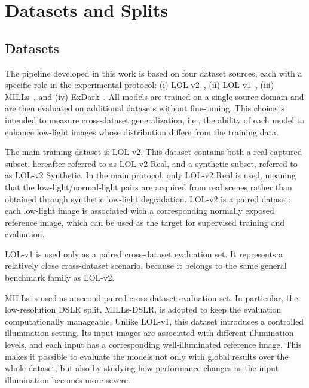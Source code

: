 \section{Datasets and Splits}
\label{sec:datasets_and_splits}

\subsection{Datasets}
\label{sec:datasets}

The pipeline developed in this work is based on four dataset sources, each with a specific role in the experimental protocol: (i) LOL-v2~\cite{DBLP:journals/tip/YangWHWL21}, (ii) LOL-v1~\cite{DBLP:conf/bmvc/WeiWY018}, (iii) MILLs~\cite{DBLP:journals/corr/abs-2511-15496}, and (iv) ExDark~\cite{DBLP:journals/cviu/LohC19}. All models are trained on a single source domain and are then evaluated on additional datasets without fine-tuning. This choice is intended to measure cross-dataset generalization, i.e., the ability of each model to enhance low-light images whose distribution differs from the training data.

The main training dataset is LOL-v2. This dataset contains both a real-captured subset, hereafter referred to as LOL-v2 Real, and a synthetic subset, referred to as LOL-v2 Synthetic. In the main protocol, only LOL-v2 Real is used, meaning that the low-light/normal-light pairs are acquired from real scenes rather than obtained through synthetic low-light degradation. LOL-v2 is a paired dataset: each low-light image is associated with a corresponding normally exposed reference image, which can be used as the target for supervised training and evaluation.

LOL-v1 is used only as a paired cross-dataset evaluation set. It represents a relatively close cross-dataset scenario, because it belongs to the same general benchmark family as LOL-v2.

MILLs is used as a second paired cross-dataset evaluation set. In particular, the low-resolution DSLR split, MILLs-DSLR, is adopted to keep the evaluation computationally manageable. Unlike LOL-v1, this dataset introduces a controlled illumination setting. Its input images are associated with different illumination levels, and each input has a corresponding well-illuminated reference image. This makes it possible to evaluate the models not only with global results over the whole dataset, but also by studying how performance changes as the input illumination becomes more severe.

